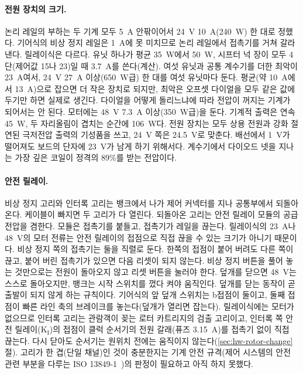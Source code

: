 \paragraph{전원 장치의 크기.} 논리 레일의 부하는 두 기계 모두 5~A 안팎이어서 24~V 10~A(240~W) 한 대로 정했다.
기어식의 비상 정지 레일은 1~A에 못 미치므로 논리 레일에서 접촉기를 거쳐 갈라 낸다. 릴레이식은 다르다. 유닛 하나가
평균 35~W에서 50~W, 시프터 넉 장이 모두 4단(제어값 15나 23)일 때 3.7~A를 쓴다(계산). 여섯 유닛과 공통 계수기를
더한 최악이 23~A여서, 24~V 27~A 이상(650~W급) 한 대를 여섯 유닛마다 둔다. 평균(약 10~A에서 13~A)으로 잡으면
더 작은 장치로 되지만, 최악은 오프셋 다이얼을 모두 같은 값에 두기만 하면 실제로 생긴다. 다이얼을 어떻게
돌리느냐에 따라 전압이 꺼지는 기계가 되어서는 안 된다. 모터에는 48~V 7.3~A 이상(350~W급)을 둔다. 기계적 출력은
연속 45~W, 두 자리올림이 겹치는 순간에 106~W다. 전원 장치는 모두 상용 전원과 강화 절연된 극저전압 출력의
기성품을 쓰고, 24~V 쪽은 24.5~V로 맞춘다. 배선에서 1~V가 떨어져도 보드의 단자에 23~V가 남게 하기 위해서다.
계수기에서 다이오드 넷을 지나는 가장 깊은 코일이 정격의 89\%를 받는 전압이다.

\paragraph{안전 릴레이.} 비상 정지 고리와 인터록 고리는 뱅크에서 나가 제어 커넥터를 지나 공통부에서 되돌아온다.
케이블이 빠지면 두 고리가 다 열린다. 되돌아온 고리는 안전 릴레이 모듈의 공급 전압을 겸한다. 모듈은 접촉기를
붙들고, 접촉기가 레일을 끊는다. 릴레이식의 23~A나 48~V의 모터 전류는 안전 릴레이의 접점으로 직접 끊을 수 있는
크기가 아니기 때문이다. 비상 정지 쪽의 접촉기는 둘을 직렬로 둔다. 한쪽의 접점이 붙어 버려도 다른 쪽이 끊고,
붙어 버린 접촉기가 있으면 다음 리셋이 되지 않는다. 비상 정지 버튼을 풀어 놓는 것만으로는 전원이 돌아오지
않고 리셋 버튼을 눌러야 한다. 덮개를 닫으면 48~V는 스스로 돌아오지만, 뱅크는 시작 스위치를 껐다 켜야 움직인다.
덮개를 닫는 동작이 곧 출발이 되지 않게 하는 규칙이다. 기어식의 앞 덮개 스위치는 b접점이 둘이고, 둘째 접점이
빠른 라인 축의 브레이크를 놓는다(덮개가 열리면 잡는다). 릴레이식에는 모터가 없으므로 인터록 고리는 관람객이
꽂는 로터 카트리지의 검출 고리이고, 인터록 쪽 안전 릴레이(K$_\mathrm{I}$)의 접점이 클럭 순서기의 전원 갈래(퓨즈 3.15~A)를 접촉기
없이 직접 끊는다. 다시 닫아도 순서기는 원위치 전에는 움직이지 않는다(\ref{sec:hw-rotor-change}절). 고리가 한
겹(단일 채널)인 것이 충분한지는 기계 안전
규격(제어 시스템의 안전 관련 부분을 다루는 ISO 13849-1~\cite{iso13849-1})의 판정이 필요하고 아직 하지 못했다.


